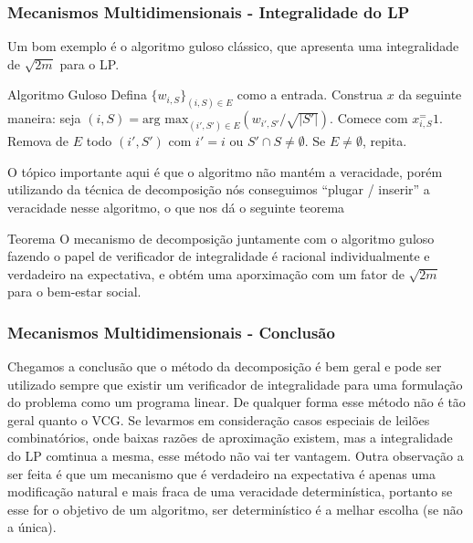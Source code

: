 \documentclass{beamer}
\begin{document}
\begin{frame}
    \frametitle{Mecanismos Multidimensionais - Integralidade do LP}
    Um bom exemplo é o algoritmo guloso clássico, que apresenta uma integralidade de $\sqrt{2m}$ para o LP.
    \begin{block}{Algoritmo Guloso}
        Defina $\{w_{i, S}\}_{(i, S) \in E}$ como a entrada. Construa $x$ da seguinte maneira: seja $(i, S) = \textrm{arg max}_{(i', S') \in E}(w_{i', S'} / \sqrt{\lvert S' \rvert}).$ Comece com $x_{i, S}^= 1$. Remova de $E$ todo $(i', S')$ com $i' = i$ ou $S' \cap S \neq \emptyset$. Se $E \neq \emptyset$, repita.
    \end{block}
    O tópico importante aqui é que o algoritmo não mantém a veracidade, porém utilizando da técnica de decomposição nós conseguimos ``plugar / inserir'' a veracidade nesse algoritmo, o que nos dá o seguinte teorema

    \begin{block}{Teorema}
        O mecanismo de decomposição juntamente com o algoritmo guloso fazendo o papel de verificador de integralidade é racional individualmente e verdadeiro na expectativa, e obtém uma aporximação com um fator de $\sqrt{2m}$ para o bem-estar social.
    \end{block}

\end{frame}

\begin{frame}
    \frametitle{Mecanismos Multidimensionais - Conclusão}
    Chegamos a conclusão que o método da decomposição é bem geral e pode ser utilizado sempre que existir um verificador de integralidade para uma formulação do problema como um programa linear. De qualquer forma esse método não é tão geral quanto o VCG. Se levarmos em consideração casos especiais de leilões combinatórios, onde baixas razões de aproximação existem, mas a integralidade do LP comtinua a mesma, esse método não vai ter vantagem. Outra observação a ser feita é que um mecanismo que é verdadeiro na expectativa é apenas uma modificação natural e mais fraca de uma veracidade determinística, portanto se esse for o objetivo de um algoritmo, ser determinístico é a melhar escolha (se não a única).
\end{frame}
\end{document}
